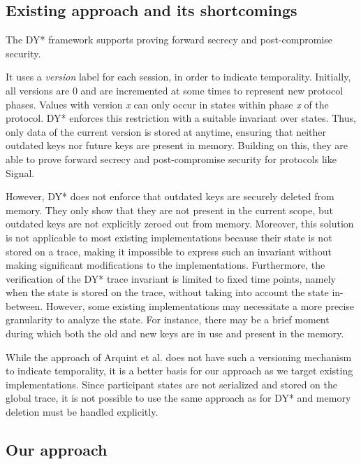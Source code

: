 \documentclass{article}
\begin{document}
\subsection{Existing approach and its shortcomings}
\label{sec:existing-approach-dy}

The DY* framework supports proving forward secrecy and post-compromise security.

It uses a \emph{version} label for each session, in order to indicate temporality. Initially, all versions are 0 and are incremented at some times to represent new protocol phases. Values with version \textit{x} can only occur in states within phase \textit{x} of the protocol. DY* enforces this restriction with a suitable invariant over states. Thus, only data of the current version is stored at anytime, ensuring that neither outdated keys nor future keys are present in memory. Building on this, they are able to prove forward secrecy and post-compromise security for protocols like Signal.

However, DY* does not enforce that outdated keys are securely deleted from memory. They only show that they are not present in the current scope, but outdated keys are not explicitly zeroed out from memory.
Moreover, this solution is not applicable to most existing implementations because their state is not stored on a trace, making it impossible to express such an invariant without making significant modifications to the implementations.
Furthermore, the verification of the DY* trace invariant is limited to fixed time points, namely when the state is stored on the trace, without taking into account the state in-between. However, some existing implementations may necessitate a more precise granularity to analyze the state. For instance, there may be a brief moment during which both the old and new keys are in use and present in the memory.

While the approach of Arquint et al. does not have such a versioning mechanism to indicate temporality, it is a better basis for our approach as we target existing implementations.
Since participant states are not serialized and stored on the global trace, it is not possible to use the same approach as for DY* and memory deletion must be handled explicitly.


\subsection{Our approach}
\label{sec:our-approach}
\end{document}

